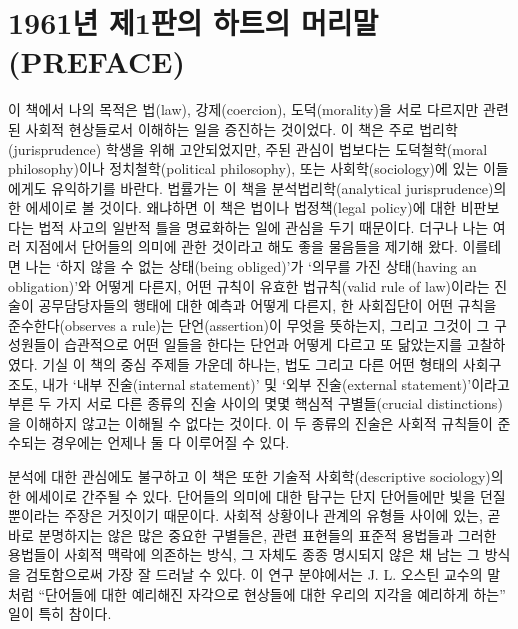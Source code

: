 \section{1961년 제1판의 하트의 머리말
(PREFACE)}\label{uxb144-uxc81c1uxd310uxc758-uxd558uxd2b8uxc758-uxba38uxb9acuxb9d0-preface}

{\small

이 책에서 나의 목적은 법(law), 강제(coercion), 도덕(morality)을 서로
다르지만 관련된 사회적 현상들로서 이해하는 일을 증진하는 것이었다. 이
책은 주로 법리학(jurisprudence) 학생을 위해 고안되었지만, 주된 관심이
법보다는 도덕철학(moral philosophy)이나 정치철학(political philosophy),
또는 사회학(sociology)에 있는 이들에게도 유익하기를 바란다. 법률가는 이
책을 분석법리학(analytical jurisprudence)의 한 에세이로 볼 것이다.
왜냐하면 이 책은 법이나 법정책(legal policy)에 대한 비판보다는 법적
사고의 일반적 틀을 명료화하는 일에 관심을 두기 때문이다. 더구나 나는
여러 지점에서 단어들의 의미에 관한 것이라고 해도 좋을 물음들을 제기해
왔다. 이를테면 나는 ‘하지 않을 수 없는 상태(being obliged)’가 ‘의무를
가진 상태(having an obligation)’와 어떻게 다른지, 어떤 규칙이 유효한
법규칙(valid rule of law)이라는 진술이 공무담당자들의 행태에 대한 예측과
어떻게 다른지, 한 사회집단이 어떤 규칙을 준수한다(observes a rule)는
단언(assertion)이 무엇을 뜻하는지, 그리고 그것이 그 구성원들이
습관적으로 어떤 일들을 한다는 단언과 어떻게 다르고 또 닮았는지를
고찰하였다. 기실 이 책의 중심 주제들 가운데 하나는, 법도 그리고 다른
어떤 형태의 사회구조도, 내가 ‘내부 진술(internal statement)’ 및 ‘외부
진술(external statement)’이라고 부른 두 가지 서로 다른 종류의 진술
사이의 몇몇 핵심적 구별들(crucial distinctions)을 이해하지 않고는 이해될
수 없다는 것이다. 이 두 종류의 진술은 사회적 규칙들이 준수되는 경우에는
언제나 둘 다 이루어질 수 있다.

분석에 대한 관심에도 불구하고 이 책은 또한 기술적 사회학(descriptive
sociology)의 한 에세이로 간주될 수 있다. 단어들의 의미에 대한 탐구는
단지 단어들에만 빛을 던질 뿐이라는 주장은 거짓이기 때문이다. 사회적
상황이나 관계의 유형들 사이에 있는, 곧바로 분명하지는 않은 많은 중요한
구별들은, 관련 표현들의 표준적 용법들과 그러한 용법들이 사회적 맥락에
의존하는 방식, 그 자체도 종종 명시되지 않은 채 남는 그 방식을
검토함으로써 가장 잘 드러날 수 있다. 이 연구 분야에서는 J. L. 오스틴
교수의 말처럼 “단어들에 대한 예리해진 자각으로 현상들에 대한 우리의
지각을 예리하게 하는” 일이 특히 참이다.

}
